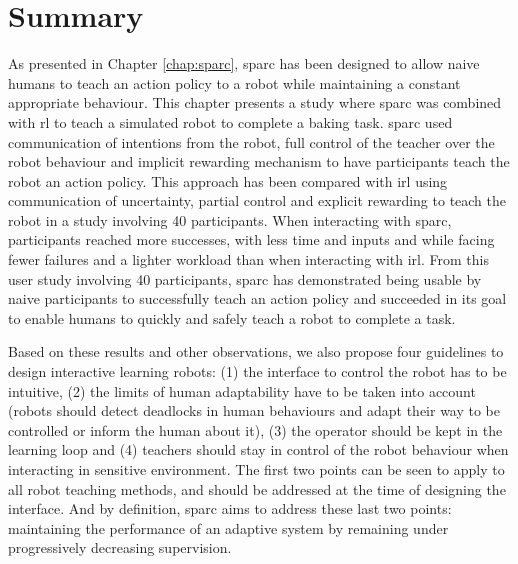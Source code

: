 \section{Summary}

As presented in Chapter \ref{chap:sparc}, \gls{sparc} has been designed to allow naive humans to teach an action policy to a robot while maintaining a constant appropriate behaviour. This chapter presents a study where \gls{sparc} was combined with \gls{rl} to teach a simulated robot to complete a baking task. \gls{sparc} used communication of intentions from the robot, full control of the teacher over the robot behaviour and implicit rewarding mechanism to have participants teach the robot an action policy. This approach has been compared with \gls{irl} using communication of uncertainty, partial control and explicit rewarding to teach the robot in a study involving 40 participants. When interacting with \gls{sparc}, participants reached more successes, with less time and inputs and while facing fewer failures and a lighter workload than when interacting with \gls{irl}. From this user study involving 40 participants, \gls{sparc} has demonstrated being usable by naive participants to successfully teach an action policy and succeeded in its goal to enable humans to quickly and safely teach a robot to complete a task.

Based on these results and other observations, we also propose four guidelines to design interactive learning robots: (1) the interface to control the robot has to be intuitive, (2) the limits of human adaptability have to be taken into account (robots should detect deadlocks in human behaviours and adapt their way to be controlled or inform the human about it), (3) the operator should be kept in the learning loop and (4) teachers should stay in control of the robot behaviour when interacting in sensitive environment. The first two points can be seen to apply to all robot teaching methods, and should be addressed at the time of designing the interface. And by definition, \gls{sparc} aims to address these last two points: maintaining the performance of an adaptive system by remaining under progressively decreasing supervision. 



